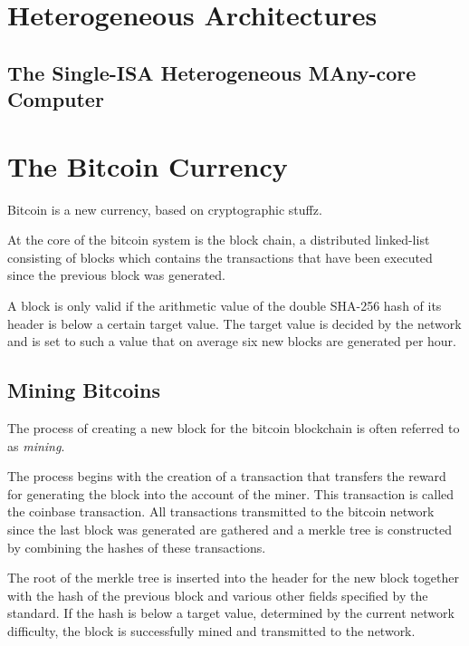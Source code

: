 
\section{Heterogeneous Architectures}
\label{sec:heterogeneous}

\subsection{The Single-ISA Heterogeneous MAny-core Computer}
\label{sec:shmac}

\section{The Bitcoin Currency}
\label{sec:bitcoins}

Bitcoin is a new currency, based on cryptographic stuffz.

At the core of the bitcoin system is the block chain, a distributed linked-list consisting of blocks
which contains the transactions that have been executed since the previous block was generated.

A block is only valid if the arithmetic value of the double SHA-256 hash of its header is below
a certain target value. The target value is decided by the network and is set to such a value that
on average six new blocks are generated per hour. \cite{bitcoin}

\subsection{Mining Bitcoins}
\label{sec:bitcoin-mining}

The process of creating a new block for the bitcoin blockchain is often referred to as \textit{mining}.

The process begins with the creation of a transaction that transfers the reward for generating the block
into the account of the miner. This transaction is called the coinbase transaction. All transactions
transmitted to the bitcoin network since the last block was generated are gathered and a merkle tree
is constructed by combining the hashes of these transactions.

The root of the merkle tree is inserted into the header for the new block together with the hash of the
previous block and various other fields specified by the standard. If the hash is below a target value,
determined by the current network difficulty, the block is successfully mined and transmitted to the
network.

